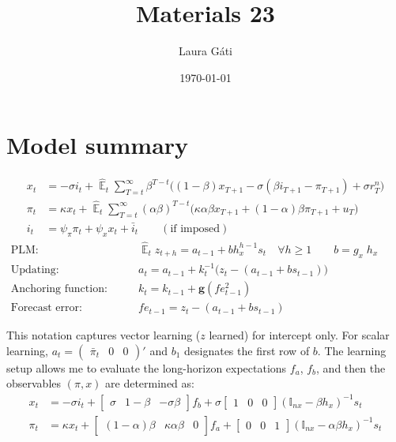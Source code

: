 \documentclass[11pt]{article}
\renewcommand{\[}{\begin{equation}}
\renewcommand{\]}{\end{equation}}
\DeclareMathOperator{\E}{\mathbb{E}}
\begin{document}
\linespread{1.0}

\title{Materials 23}
\author{Laura G\'ati} 
\date{\today}
\maketitle


\tableofcontents



\newpage
\appendix

\section{Model summary}
\begin{align}
x_t &=  -\sigma i_t +\hat{\E}_t \sum_{T=t}^{\infty} \beta^{T-t }\big( (1-\beta)x_{T+1} - \sigma(\beta i_{T+1} - \pi_{T+1}) +\sigma r_T^n \big)  \label{prestons18}  \\
\pi_t &= \kappa x_t +\hat{\E}_t \sum_{T=t}^{\infty} (\alpha\beta)^{T-t }\big( \kappa \alpha \beta x_{T+1} + (1-\alpha)\beta \pi_{T+1} + u_T\big) \label{prestons19}  \\
i_t &= \psi_{\pi}\pi_t + \psi_{x} x_t  + \bar{i}_t \label{TR} \quad \quad (\text{if imposed})
\end{align}
\begin{align}
\text{PLM:} \quad \quad & \hat{\E}_t z_{t+h}  =  a_{t-1} + bh_x^{h-1}s_t  \quad \forall h\geq 1 \quad \quad b = g_x\; h_x \quad \quad  \label{PLM} \\
\text{Updating:} \quad \quad & a_{t}  =a_{t-1} +k_t^{-1}\big(z_{t} -(a_{t-1}+b s_{t-1}) \big)  \\
\text{Anchoring function:} \quad \quad & k_t  = k_{t-1} + \mathbf{g}(fe_{t-1}^2) \\
\text{Forecast error:} \quad \quad & fe_{t-1}  = z_t - (a_{t-1}+b s_{t-1})
\end{align}

This notation captures vector learning ($z$ learned) for intercept only. For scalar learning, $a_t= \begin{pmatrix} \bar{\pi}_t & 0 & 0\end{pmatrix}' $ and $b_1$ designates the first row of $b$. The learning setup allows me to evaluate the long-horizon expectations $f_a$, $f_b$, and then the observables $(\pi, x)$ are determined as:
\begin{align}
x_t &=  -\sigma i_t + \begin{bmatrix} \sigma & 1-\beta & -\sigma\beta \end{bmatrix} f_b + \sigma \begin{bmatrix} 1 & 0 & 0 \end{bmatrix} (\mathbb{I}_{nx} - \beta h_x)^{-1} s_t\\
\pi_t &= \kappa x_t  + \begin{bmatrix} (1-\alpha)\beta & \kappa\alpha\beta & 0 \end{bmatrix}  f_a + \begin{bmatrix} 0 & 0 & 1 \end{bmatrix}  (\mathbb{I}_{nx} - \alpha \beta h_x)^{-1}  s_t
\end{align}
\end{document}
